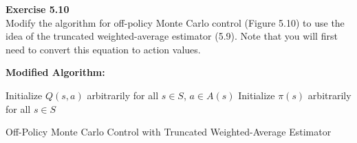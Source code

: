 \documentclass[addpoints]{exam}
\begin{document}
\begin{questions}
    \question
    \textbf{Exercise 5.10} \\ Modify the algorithm for off-policy Monte Carlo control (Figure 5.10) to use the idea of the truncated weighted-average estimator (5.9). Note that you will first need to convert this equation to action values.
    \begin{solution}
        \textbf{Modified Algorithm:}

\begin{algorithm}[H]
    Initialize \( Q(s, a) \) arbitrarily for all \( s \in S \), \( a \in A(s) \)\;
    Initialize \( \pi(s) \) arbitrarily for all \( s \in S \)\;
    \caption{Off-Policy Monte Carlo Control with Truncated Weighted-Average Estimator}
\end{algorithm}
    \end{solution}
\end{questions}
\end{document}
